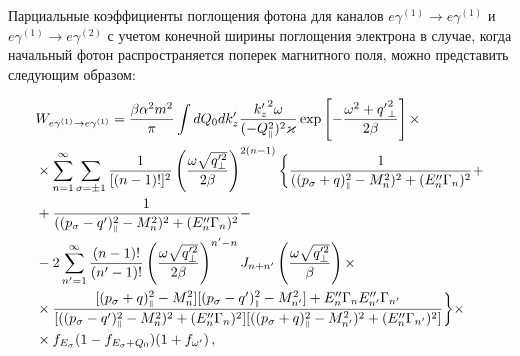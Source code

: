  Парциальные коэффициенты поглощения фотона для каналов $e \gamma^{(1)} \to 
 e\gamma^{(1)}$ и $e \gamma^{(1)} \to e\gamma^{(2)}$ с учетом конечной ширины 
 поглощения электрона в случае, когда начальный фотон 
 распространяется поперек магнитного поля, можно 
 представить следующим образом:


\begin{equation}\nonumber
	\begin{aligned}\label{Wres}
		&W_{e\gamma^{(1)}\to e\gamma^{(1)}}=\frac{\beta\alpha^2m^2}{\pi} \int dQ_0dk'_z \frac{{k_z'}^2\omega } {(-Q_{\mbox{\tiny $\|$}}^2)^2\varkappa}\exp\left[-\frac{\omega^2+{q'}_\perp^2}{2\beta}\right]\times\\ 
		&\times\sum_{n=1}^{\infty}\sum_{\sigma=\pm 1}\frac{1}{[(n-1)!]^2}\left(\frac{\omega \sqrt{q_\perp'^2}}{2\beta}\right)^{2(n-1)}\bigg\{
		\frac{1}{((p_\sigma+q)_{\mbox{\tiny $\|$}}^2-M_n^2)^2+(E''_n\Gamma_n)^2}  +\\
		&+\frac{1}{((p_\sigma-q')_{\mbox{\tiny $\|$}}^2-M_n^2)^2+(E''_n\Gamma_n)^2}-
		\\
		&-2
		\sum_{n'=1}^{\infty}\frac{(n-1)!}{(n'-1)!}\left(\frac{\omega \sqrt{q_\perp'^2}}{2\beta}\right)^{n'-n}J_{n+n'}\left(\frac{\omega \sqrt{q_\perp'^2}}{\beta}\right)\times\\
		&\times\frac{[(p_\sigma+q)^2_{\mbox{\tiny $\|$}}-M_n^2][(p_\sigma-q')^2_{\mbox{\tiny $\|$}}-M^2_{n'}]+E''_n\Gamma_nE''_{n'}\Gamma_{n'}}{[((p_\sigma-q')_{\mbox{\tiny $\|$}}^2-M_n^2)^2+(E''_n\Gamma_n)^2][((p_\sigma+q)_{\mbox{\tiny $\|$}}^2-M_{n'}^2)^2+(E''_n\Gamma_{n'})^2]}
		\bigg\}\times
		\\&\times f_{E_\sigma}(1-f_{E_\sigma+Q_0})(1+f_{\omega'}
		) \, ,
	\end{aligned}
\end{equation}

